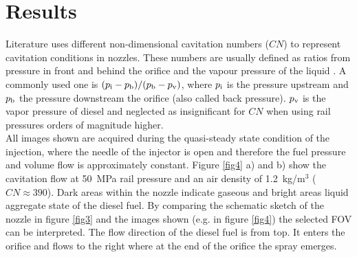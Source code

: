 \documentclass[letterpaper,twocolumn,10pt]{ilass}
\begin{document}
\section*{Results}
Literature uses different non-dimensional cavitation numbers ($CN$) to represent cavitation
conditions in nozzles. These numbers are usually defined as ratios from pressure in front and
behind the orifice and the vapour pressure of the liquid \cite{Hult2016, Giannadakis2008}.
A commonly used one is
$(p\textsubscript{i} - p\textsubscript{b})/(p\textsubscript{b}-p\textsubscript{v})$,
where $p\textsubscript{i}$ is the pressure upstream and $p\textsubscript{b}$ the pressure
downstream the orifice (also called back pressure). $p\textsubscript{v}$ is the vapor pressure
of diesel and neglected as insignificant for $CN$ when using rail pressures orders of magnitude
higher.\\
%
All images shown are acquired during the quasi-steady state condition of the injection, where
the needle of the injector is open and therefore the fuel pressure and volume flow is
approximately constant. Figure \ref{fig4} a) and b) show the cavitation flow at 50~MPa rail
pressure and an air density of 1.2~kg/m$^3$ ($CN \approx 390$). Dark areas within the nozzle
indicate gaseous and bright areas liquid aggregate state of the diesel fuel. By comparing the
schematic sketch of the nozzle in figure \ref{fig3} and the images shown
(e.g. in figure \ref{fig4}) the selected FOV can be interpreted. The flow direction of the
diesel fuel is from top. It enters the orifice and flows to the right where at the end of the
orifice the spray emerges.
\end{document}
